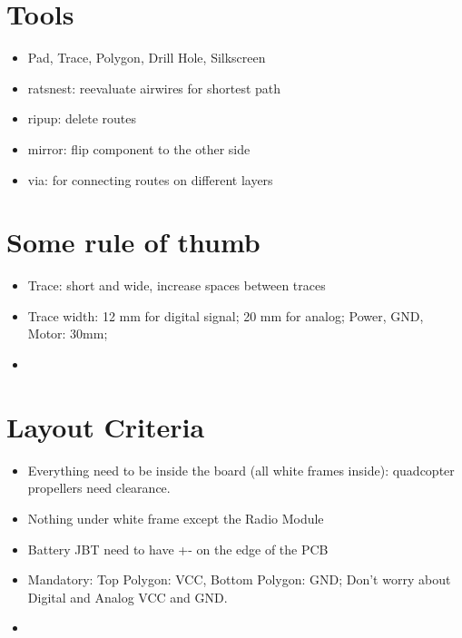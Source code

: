 \documentclass[11pt]{article}
\author{Wilson Chang}
\date{\today}
\title{}
\begin{document}
\tableofcontents

\section{Tools}
\label{sec:org7c74fd7}
\begin{itemize}
\item Pad, Trace, Polygon, Drill Hole, Silkscreen
\item ratsnest: reevaluate airwires for shortest path
\item ripup: delete routes
\item mirror: flip component to the other side
\item via: for connecting routes on different layers
\end{itemize}
\section{Some rule of thumb}
\label{sec:orga9969b8}
\begin{itemize}
\item Trace: short and wide, increase spaces between traces
\item Trace width: 12 mm for digital signal; 20 mm for analog; Power, GND, Motor: 30mm;
\item 
\end{itemize}
\section{Layout Criteria}
\label{sec:org05233ab}
\begin{itemize}
\item Everything need to be inside the board (all white frames inside): quadcopter propellers need clearance.
\item Nothing under white frame except the Radio Module
\item Battery JBT need to have +- on the edge of the PCB
\item Mandatory: Top Polygon: VCC, Bottom Polygon: GND; Don't worry about Digital and Analog VCC and GND.
\item 
\end{itemize}
\end{document}
